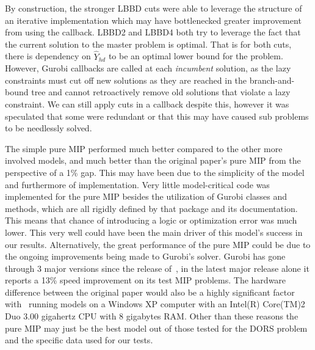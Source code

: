 By construction, the stronger LBBD cuts were able to leverage the structure of an iterative implementation which may have bottlenecked greater improvement from using the callback. LBBD2 and LBBD4 both try to leverage the fact that the current solution to the master problem is optimal. That is for both cuts, there is dependency on $\hat{Y}_{hd}$ to be an optimal lower bound for the problem. However, Gurobi callbacks are called at each \textit{incumbent} solution, as the lazy constraints must cut off new solutions as they are reached in the branch-and-bound tree and cannot retroactively remove old solutions that violate a lazy constraint. We can still apply cuts in a callback despite this, however it was speculated that some were redundant or that this may have caused sub problems to be needlessly solved. 



The simple pure MIP performed much better compared to the other more involved models, and much better than the original paper's pure MIP from the perspective of a 1\% gap. This may have been due to the simplicity of the model and furthermore of implementation. Very little model-critical code was implemented for the pure MIP besides the utilization of Gurobi classes and methods, which are all rigidly defined by that package and its documentation. This means that chance of introducing a logic or optimization error was much lower. This very well could have been the main driver of this model's success in our results. Alternatively, the great performance of the pure MIP could be due to the ongoing improvements being made to Gurobi's solver. Gurobi has gone through 3 major versions since the release of~\cite{roshanaei2017propagating},  in the latest major release alone it reports a 13\% speed improvement on its test MIP problems\cite{gurobiBragging}. The hardware difference between the original paper would also be a highly significant factor with~\cite{roshanaei2017propagating} running models on a Windows XP computer with an
Intel(R) Core(TM)2 Duo 3.00 gigahertz CPU with 8 gigabytes RAM. Other than these reasons the pure MIP may just be the best model out of those tested for the DORS problem and the specific data used for our tests. 